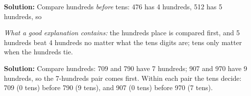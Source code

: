 \documentclass[12pt]{article}
\begin{document}

\textbf{Solution:} Compare hundreds \emph{before} tens: 476 has 4 hundreds,
512 has 5 hundreds, so 

\emph{What a good explanation contains:} the hundreds place is compared
first, and 5 hundreds beat 4 hundreds no matter what the tens digits are;
tens only matter when the hundreds tie.


\textbf{Solution:} Compare hundreds: 709 and 790 have 7 hundreds; 907 and
970 have 9 hundreds, so the 7-hundreds pair comes first. Within each pair the
tens decide: 709 (0 tens) before 790 (9 tens), and 907 (0 tens) before 970
(7 tens). 
\end{document}
